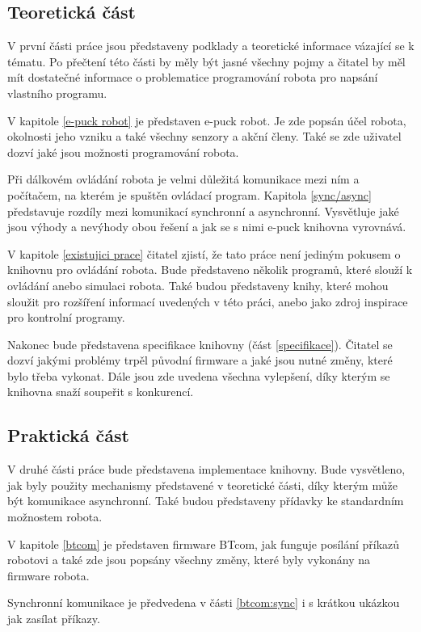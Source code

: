 \subsection*{Teoretická část}
V první části práce jsou představeny podklady a teoretické informace
vázající se k tématu. Po přečtení této části by měly být jasné všechny
pojmy a čitatel by měl mít dostatečné informace o problematice programování
robota pro napsání vlastního programu.

V kapitole \ref{e-puck robot} je představen e-puck robot. Je zde popsán
účel robota, okolnosti jeho vzniku a také všechny senzory a akční členy.
Také se zde uživatel dozví jaké jsou možnosti programování robota.

Při dálkovém ovládání robota je velmi důležitá komunikace mezi ním a
počítačem, na kterém je spuštěn ovládací program. Kapitola \ref{sync/async}
představuje rozdíly mezi komunikací synchronní a asynchronní. Vysvětluje
jaké jsou výhody a nevýhody obou řešení a jak se s nimi e-puck knihovna
vyrovnává.

V kapitole \ref{existujici prace} čitatel zjistí, že tato práce není
jediným pokusem o knihovnu pro ovládání robota. Bude představeno několik
programů, které slouží k ovládání anebo simulaci robota. Také budou
představeny knihy, které mohou sloužit pro rozšíření informací uvedených v
této práci, anebo jako zdroj inspirace pro kontrolní programy.

Nakonec bude představena specifikace knihovny (část \ref{specifikace}).
Čitatel se dozví jakými problémy trpěl původní firmware a jaké jsou nutné
změny, které bylo třeba vykonat. Dále jsou zde uvedena všechna vylepšení,
díky kterým se knihovna snaží soupeřit s konkurencí.

\subsection*{Praktická část}
V druhé části práce bude představena implementace knihovny. Bude
vysvětleno, jak byly použity mechanismy představené v teoretické části,
díky kterým může být komunikace asynchronní. Také budou představeny
přídavky ke standardním možnostem robota.

V kapitole \ref{btcom} je představen firmware BTcom, jak funguje posílání
příkazů robotovi a také zde jsou popsány všechny změny, které byly vykonány
na firmware robota.

Synchronní komunikace je předvedena v části \ref{btcom:sync} i s krátkou
ukázkou jak zasílat příkazy.

